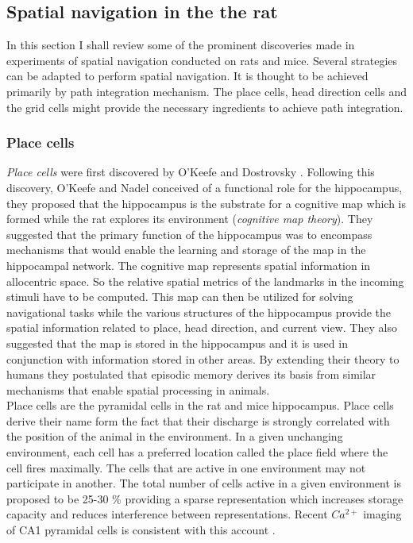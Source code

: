 \subsection{Spatial navigation in the the rat}
In this section I shall review some of the prominent discoveries made in experiments of spatial navigation conducted on rats and mice. Several strategies can be adapted to perform spatial navigation. It is thought to be achieved primarily by path integration mechanism. The place cells, head direction cells and the grid cells might provide the necessary ingredients to achieve path integration. 

\subsubsection{Place cells}
\label{placeCells}
 \emph{Place cells} were first discovered by O'Keefe and Dostrovsky \cite{O'Keefe1971a}. Following this discovery, O'Keefe and Nadel \cite{Street} conceived of a functional role for the hippocampus, they proposed that the hippocampus is the substrate for a cognitive map which is formed while the rat explores its environment (\emph{cognitive map theory}). They suggested that the primary function of the hippocampus was to encompass mechanisms that would enable the learning and storage of the map in the hippocampal network. The cognitive map represents spatial information in allocentric space. So the relative spatial metrics of the landmarks in the incoming stimuli have to be computed. This map can then be utilized for solving navigational tasks while the various structures of the hippocampus provide the spatial information related to place, head direction, and current view. They also suggested that the map is stored in the hippocampus and it is used in conjunction with information stored in other areas. By extending their theory to humans they postulated that episodic memory derives its basis from similar mechanisms that enable spatial processing in animals.\\ 
Place cells are the  pyramidal cells in the rat and mice hippocampus. Place cells derive their name form the fact that their discharge is strongly correlated with the position of the animal in the environment. In a given unchanging environment, each cell has a preferred location called the place field where the cell fires maximally.  The cells that are active in one environment may not participate in another. The total number of cells active in a given environment is proposed to be 25-30 \% providing a sparse representation which increases storage capacity and reduces interference between representations\cite{Marr2007, Wilson1993a}. Recent $Ca^{2+}$ imaging of CA1 pyramidal cells is consistent with this account \cite{Ziv2013}.
